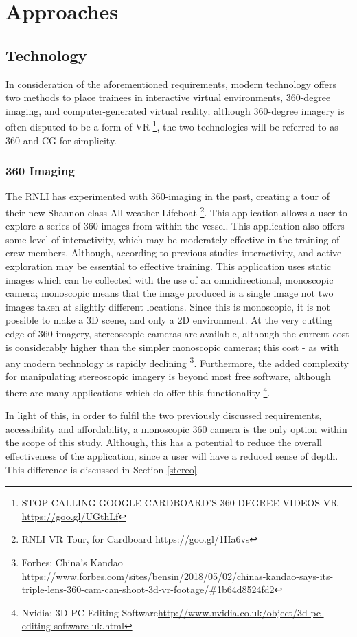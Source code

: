 \documentclass[ %
                    author={Elis Jones},
                supervisor={Dr. Kirsten Cater},
                    degree={BSc},
                     title={The Effect of Presentation Medium on Spatial Cognition},
                  subtitle={in the Virtual Environment},
                      year={2018} ]{dissertation}
\begin{document}
\section{Approaches}
\subsection{Technology}
In consideration of the aforementioned requirements, modern technology offers two methods to place trainees in interactive virtual environments, 360-degree imaging, and computer-generated virtual reality; although 360-degree imagery is often disputed to be a form of VR \footnote{STOP CALLING GOOGLE CARDBOARD'S 360-DEGREE VIDEOS VR \url{https://goo.gl/UGthLf}}, the two technologies will be referred to as 360 and CG for simplicity. 

\subsubsection{360 Imaging}
The RNLI has experimented with 360-imaging in the past, creating a tour of their new Shannon-class All-weather Lifeboat \footnote{RNLI VR Tour, for Cardboard \url{https://goo.gl/1Ha6vs}}. This application allows a user to explore a series of 360 images from within the vessel. This application also offers some level of interactivity, which may be moderately effective in the training of crew members. Although, according to previous studies interactivity, and active exploration may be essential to effective training. This application uses static images which can be collected with the use of an omnidirectional, monoscopic camera; monoscopic means that the image produced is a single image not two images taken at slightly different locations. Since this is monoscopic, it is not possible to make a 3D scene, and only a 2D environment. At the very cutting edge of 360-imagery, stereoscopic cameras are available, although the current cost is considerably higher than the simpler monoscopic cameras; this cost - as with any modern technology is rapidly declining \footnote{Forbes: China's Kandao \url{https://www.forbes.com/sites/bensin/2018/05/02/chinas-kandao-says-its-triple-lens-360-cam-can-shoot-3d-vr-footage/#1b64d8524fd2}}. Furthermore, the added complexity for manipulating stereoscopic imagery is beyond most free software, although there are many applications which do offer this functionality \footnote{Nvidia: 3D PC Editing Software\url{http://www.nvidia.co.uk/object/3d-pc-editing-software-uk.html}}. 

In light of this, in order to fulfil the two previously discussed requirements, accessibility and affordability, a monoscopic 360 camera is the only option within the scope of this study. Although, this has a potential to reduce the overall effectiveness of the application, since a user will have a reduced sense of depth. This difference is discussed in Section \ref{stereo}.
\end{document}
